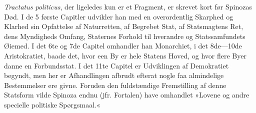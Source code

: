 \documentclass[12pt,a4paper]{book}
\begin{document}
\emph{Tractatus politicus}, der ligeledes kun er et Fragment, er skrevet
kort før Spinozas Død. I de 5 første Capitler udvikler han med en
overordentlig Skarphed og Klarhed sin Opfattelse af Naturretten, af
Begrebet Stat, af Statsmagtens Ret, dens Myndigheds Omfang, Staternes
Forhold til hverandre og Statssamfundets Øiemed. I det 6te og 7de Capitel
omhandler han Monarchiet, i det 8de---10de Aristokratiet, baade det, hvor
een By er hele Statens Hoved, og hvor flere Byer danne en Forbundsstat. I
det 11te Capitel er Udviklingen af Demokratiet begyndt, men her er
Afhandlingen afbrudt efterat nogle faa almindelige Bestemmelser ere givne.
Foruden den fuldstændige Fremstilling af denne Statsform vilde Spinoza
endnu (jfr. Fortalen) have omhandlet »Lovene og andre specielle politiske
Spørgsmaal.«
\end{document}
